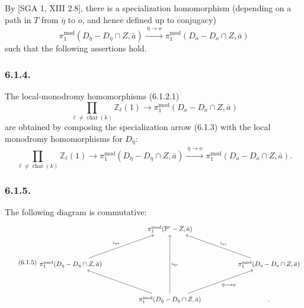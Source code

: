 By [SGA 1, XIII 2.8], there is a specialization homomorphism (depending on
a path in $T$ from $\bar\eta$ to $o$, and hence defined up to conjugacy)
\begin{equation}\tag{6.1.3}
\pi_1^{\mathrm{mod}}(D_{\bar\eta}-D_{\bar\eta}\cap Z,\bar a)
\xrightarrow{\ \bar\eta\longrightarrow o\ }
\pi_1^{\mathrm{mod}}(D_o-D_o\cap Z,\bar a)
\end{equation}
such that the following assertions hold.

\subsubsection*{6.1.4.}
The local-monodromy homomorphisms (6.1.2.1)
\[
\prod_{\ell\ne\operatorname{char}(k)}\mathbb Z_\ell(1)
\longrightarrow
\pi_1^{\mathrm{mod}}(D_o-D_o\cap Z,\bar a)
\]
are obtained by composing the specialization arrow (6.1.3) with the local
monodromy homomorphisms for $D_{\bar\eta}$:
\begin{equation}\tag{6.1.4.1}
\prod_{\ell\ne\operatorname{char}(k)}\mathbb Z_\ell(1)
\longrightarrow
\pi_1^{\mathrm{mod}}(D_{\bar\eta}-D_{\bar\eta}\cap Z,\bar a)
\xrightarrow{\ \bar\eta\longrightarrow o\ }
\pi_1^{\mathrm{mod}}(D_o-D_o\cap Z,\bar a).
\end{equation}

\subsubsection*{6.1.5.}
The following diagram is commutative:
\begin{equation}\tag{6.1.5}
\begin{tikzcd}[column sep=huge,row sep=huge]
{} & \pi_1^{\mathrm{mod}}(\mathbb P^r-Z,\bar a) & {} \\
\pi_1^{\mathrm{mod}}(D_\eta-D_\eta\cap Z,\bar a)
  \arrow[ur,"i_{\eta*}"]
& {}
& \pi_1^{\mathrm{mod}}(D_o-D_o\cap Z,\bar a)
  \arrow[ul,"i_{o*}"'] \\
{} & \pi_1^{\mathrm{mod}}(D_{\bar\eta}-D_{\bar\eta}\cap Z,\bar a)
  \arrow[uu,"i_{\bar\eta*}"']
  \arrow[ul]
  \arrow[ur,"\bar\eta\longrightarrow o"'] & {} .
\end{tikzcd}
\end{equation}

